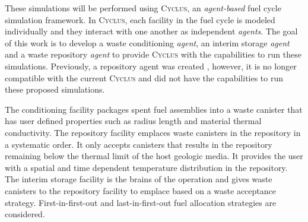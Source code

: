 \documentclass[11pt, letterpaper]{article}
\renewcommand *\footnoterule{}
\begin{document}
These simulations will be performed using \textsc{Cyclus}, an 
\textit{agent-based} fuel cycle simulation framework. 
In \textsc{Cyclus}, each facility in the fuel cycle is modeled individually 
and they interact with one another as independent \textit{agents}. 
The goal of this work is to develop a waste conditioning \textit{agent}, 
an interim storage \textit{agent} and a waste repository \textit{agent} 
to provide \textsc{Cyclus} with the capabilities to run these simulations. 
Previously, a repository agent was created \cite{huff_cyclus_2013}, however, 
it is no longer compatible with the current \textsc{Cyclus} and 
did not have the capabilities to run these proposed simulations.  

The conditioning facility packages spent fuel assemblies into a waste canister 
that has user defined properties such as radius length and material thermal 
conductivity. 
The repository facility emplaces waste canisters in the repository in a
systematic order. 
It only accepts canisters that results in the repository 
remaining below the thermal limit of the host geologic media. 
It provides the user with a spatial and time dependent temperature 
distribution in the repository. 
The interim storage facility is the brains of the operation and gives 
waste canisters to the repository facility to emplace based on a waste 
acceptance strategy. 
First-in-first-out and last-in-first-out fuel allocation strategies 
are considered. 




\end{document}
